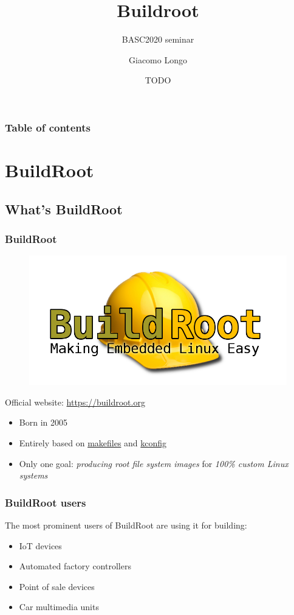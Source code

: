\documentclass{beamer}
\title{Buildroot}
\subtitle{BASC2020 seminar}
\author{Giacomo Longo}
\institute{University of Genoa}
\date{TODO}
\begin{document}
\begin{frame}
  \titlepage
\end{frame}
\begin{frame}
  \frametitle{Table of contents}
  \tableofcontents
\end{frame}
\section{BuildRoot}
\subsection{What's BuildRoot}
\begin{frame}
  \frametitle{BuildRoot}
  \begin{figure}
    \begin{center}
      \includegraphics[width=.5\textwidth]{logo-buildroot}
    \end{center}
  \end{figure}
  \begin{center}
    Official website: \url{https://buildroot.org}
  \end{center}
  \begin{itemize}
    \item Born in 2005
    \item Entirely based on \href{https://en.wikipedia.org/wiki/Make_(software)}{makefiles} and \href{https://www.kernel.org/doc/html/latest/kbuild/kconfig-language.html}{kconfig}
    \item Only one goal: \textit{producing root file system images} for \textit{100\% custom Linux systems}
  \end{itemize}
\end{frame}
\begin{frame}
  \frametitle{BuildRoot users}
  The most prominent users of BuildRoot are using it for building:
  \begin{itemize}
    \item IoT devices
    \item Automated factory controllers
    \item Point of sale devices
    \item Car multimedia units
  \end{itemize}
\end{frame}
\end{document}
